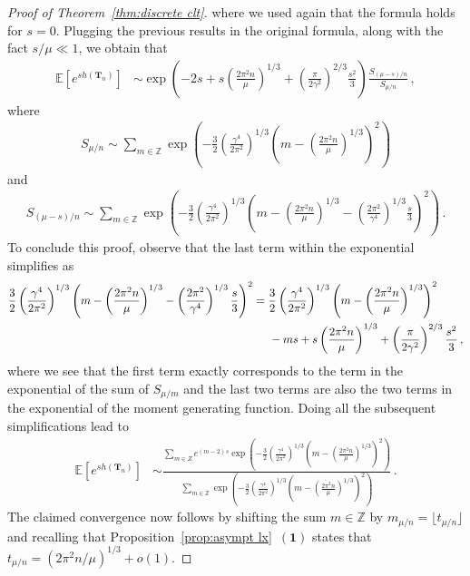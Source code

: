 \documentclass{article}
\newcommand{\E}{\mathbb{E}}								%
\newcommand{\1}{\mathbbm{1}}								%
\theoremstyle{definition}
\numberwithin{equation}{section}
\newcommand{\bT}{\mathbf T}
\newcommand{\Z}{\mathbb Z}
\newcommand{\numitem}[1]{$\mathbf{(#1)}$}
\begin{document}
\begin{proof}[Proof of Theorem~\ref{thm:discrete clt}]
    where we used again that the formula holds for $s=0$.
    Plugging the previous results in the original formula, along with the fact $s/\mu\ll1$, we obtain that
    \begin{align*}
        \E\left[e^{sh(\bT_n)}\right]&\sim\exp\left(-2s+s\left(\frac{2\pi^2n}{\mu}\right)^{1/3}+\left(\frac{\pi}{2\gamma^2}\right)^{2/3}\frac{s^2}{3}\right)\frac{S_{(\mu-s)/n}}{S_{\mu/n}}\,,
    \end{align*}
    where
    \begin{align*}
        S_{\mu/n}\sim\sum_{m\in\Z}\exp\left(-\frac{3}{2}\left(\frac{\gamma^4}{2\pi^2}\right)^{1/3}\left(m-\left(\frac{2\pi^2n}{\mu}\right)^{1/3}\right)^2\right)
    \end{align*}
    and
    \begin{align*}
        S_{(\mu-s)/n}\sim\sum_{m\in\Z}\exp\left(-\frac{3}{2}\left(\frac{\gamma^4}{2\pi^2}\right)^{1/3}\left(m-\left(\frac{2\pi^2n}{\mu}\right)^{1/3}-\left(\frac{2\pi^2}{\gamma^4}\right)^{1/3}\frac{s}{3}\right)^2\right)\,.
    \end{align*}
    To conclude this proof, observe that the last term within the exponential simplifies as
    \begin{align*}
        \frac{3}{2}\left(\frac{\gamma^4}{2\pi^2}\right)^{1/3}\left(m-\left(\frac{2\pi^2n}{\mu}\right)^{1/3}-\left(\frac{2\pi^2}{\gamma^4}\right)^{1/3}\frac{s}{3}\right)^2&=\frac{3}{2}\left(\frac{\gamma^4}{2\pi^2}\right)^{1/3}\left(m-\left(\frac{2\pi^2n}{\mu}\right)^{1/3}\right)^2\\
        &\hspace{0.5cm}-ms+s\left(\frac{2\pi^2n}{\mu}\right)^{1/3}+\left(\frac{\pi}{2\gamma^2}\right)^{2/3}\frac{s^2}{3}\,,
    \end{align*}
    where we see that the first term exactly corresponds to the term in the exponential of the sum of $S_{\mu/m}$ and the last two terms are also the two terms in the exponential of the moment generating function.
    Doing all the subsequent simplifications lead to
    \begin{align*}
        \E\left[e^{sh(\bT_n)}\right]&\sim\frac{\displaystyle\sum_{m\in Z}e^{(m-2)s}\exp\left(-\frac{3}{2}\left(\frac{\gamma^4}{2\pi^2}\right)^{1/3}\left(m-\left(\frac{2\pi^2n}{\mu}\right)^{1/3}\right)^2\right)}{\displaystyle\sum_{m\in\Z}\exp\left(-\frac{3}{2}\left(\frac{\gamma^4}{2\pi^2}\right)^{1/3}\left(m-\left(\frac{2\pi^2n}{\mu}\right)^{1/3}\right)^2\right)}\,.
    \end{align*}
    The claimed convergence now follows by shifting the sum $m\in\Z$ by $m_{\mu/n}=\lfloor t_{\mu/n}\rfloor$ and recalling that Proposition~\ref{prop:asympt lx}~\numitem{1} states that $t_{\mu/n}=(2\pi^2n/\mu)^{1/3}+o(1)$.
\end{proof}
\end{document}
